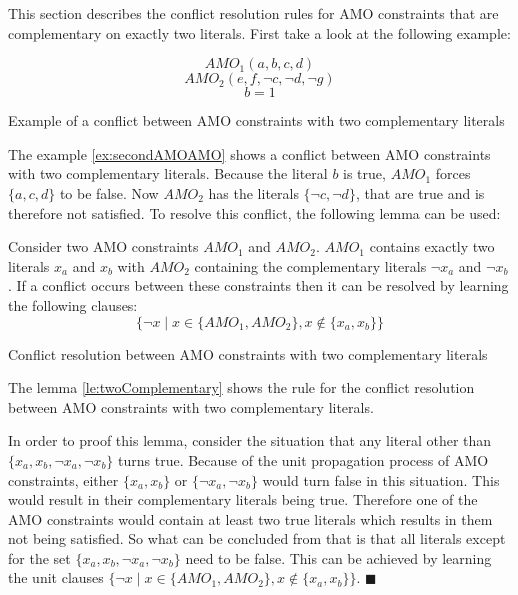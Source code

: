 This section describes the conflict resolution rules for AMO constraints that are complementary on exactly two literals. First take a look at the following example:
\begin{example}[!htb]
\begin{leftbar}
\begin{displaymath}
AMO_1(a,b,c,d)
\end{displaymath}
\begin{displaymath}
AMO_2(e,f,\neg c,\neg d, \neg g)
\end{displaymath}
\begin{displaymath}
b = 1
\end{displaymath}
\end{leftbar}
\caption{Example of a conflict between AMO constraints with two complementary literals}
\label{ex:secondAMOAMO}
\end{example}
The example \ref{ex:secondAMOAMO} shows a conflict between AMO constraints with two complementary literals. Because the literal $b$ is true, $AMO_1$ forces $\{a,c,d\}$ to be false. Now $AMO_2$ has the literals $\{\neg c,\neg d\}$, that are true and is therefore not satisfied. To resolve this conflict, the following lemma can be used:

\begin{lemma}
\begin{leftbar}
Consider two AMO constraints $AMO_1$ and $AMO_2$. $AMO_1$ contains exactly two literals $x_a$ and $x_b$ with $AMO_2$ containing the complementary literals $\neg x_a$ and $\neg x_b$.
If a conflict occurs between these constraints then it can be resolved by learning the following clauses:
\begin{displaymath}
\{\neg x \; | \; x \in \{AMO_1,AMO_2\}, x \notin \{x_a,x_b\}\}
\end{displaymath}
\end{leftbar}
\caption{Conflict resolution between AMO constraints with two complementary literals}
\label{le:twoComplementary}
\end{lemma}

The lemma \ref{le:twoComplementary} shows the rule for the conflict resolution between AMO constraints with two complementary literals.

In order to proof this lemma, consider the situation that any literal other than \newline $\{x_a, x_b, \neg x_a, \neg x_b\}$ turns true. Because of the unit propagation process of AMO constraints, either $\{x_a, x_b\}$ or $\{\neg x_a, \neg x_b\}$ would turn false in this situation. This would result in their complementary literals being true. Therefore one of the AMO constraints would contain at least two true literals which results in them not being satisfied. So what can be concluded from that is that all literals except for the set $\{x_a, x_b, \neg x_a, \neg x_b\}$ need to be false. This can be achieved by learning the unit clauses $\{\neg x \; | \; x \in \{AMO_1,AMO_2\}, x \notin \{x_a,x_b\}\}$. $\blacksquare$

